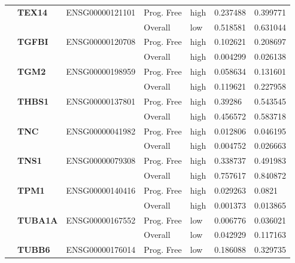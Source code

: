 \begin{spacing}{1}
{\begin{longtable}{%
            |>{\bfseries}p{2cm}|
            >{\bfseries}p{1.9cm}|
            >{\tiny}p{1.9cm}|
            p{2cm}|
            p{2cm}|
            p{1.5cm}|
            p{1.5cm}|
            }
             & TEX14    & ENSG00000121101 & Prog. Free & high & 0.237488 & 0.399771 \\
            \hhline{~~~----}
             &          &                 & Overall    & low  & 0.518581 & 0.631044 \\
            \hhline{~======}
             & TGFBI    & ENSG00000120708 & Prog. Free & high & 0.102621 & 0.208697 \\
            \hhline{~~~----}
             &          &                 & Overall    & high & 0.004299 & 0.026138 \\
            \hhline{~======}
             & TGM2     & ENSG00000198959 & Prog. Free & high & 0.058634 & 0.131601 \\
            \hhline{~~~----}
             &          &                 & Overall    & high & 0.119621 & 0.227958 \\
            \hhline{~======}
             & THBS1    & ENSG00000137801 & Prog. Free & high & 0.39286  & 0.543545 \\
            \hhline{~~~----}
             &          &                 & Overall    & high & 0.456572 & 0.583718 \\
            \hhline{~======}
             & TNC      & ENSG00000041982 & Prog. Free & high & 0.012806 & 0.046195 \\
            \hhline{~~~----}
             &          &                 & Overall    & high & 0.004752 & 0.026663 \\
            \hhline{~======}
             & TNS1     & ENSG00000079308 & Prog. Free & high & 0.338737 & 0.491983 \\
            \hhline{~~~----}
             &          &                 & Overall    & high & 0.757617 & 0.840872 \\
            \hhline{~======}
             & TPM1     & ENSG00000140416 & Prog. Free & high & 0.029263 & 0.0821   \\
            \hhline{~~~----}
             &          &                 & Overall    & high & 0.001373 & 0.013865 \\
            \hhline{~======}
             & TUBA1A   & ENSG00000167552 & Prog. Free & low  & 0.006776 & 0.036021 \\
            \hhline{~~~----}
             &          &                 & Overall    & low  & 0.042929 & 0.117163 \\
            \hhline{~======}
             & TUBB6    & ENSG00000176014 & Prog. Free & low  & 0.186088 & 0.329735 \\

\end{longtable}}
\end{spacing}
